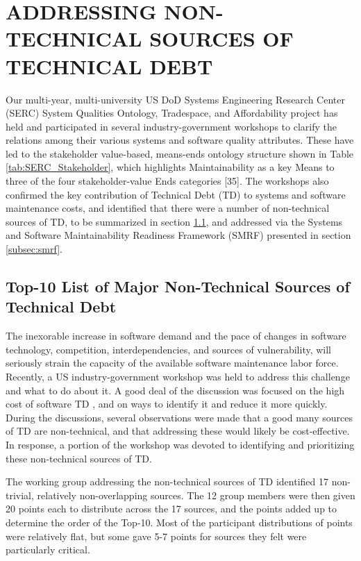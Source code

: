 \section{ADDRESSING NON-TECHNICAL SOURCES OF TECHNICAL DEBT}
\label{sec:smrf}

Our multi-year, multi-university US DoD Systems Engineering Research Center (SERC) System Qualities Ontology, Tradespace, and Affordability project has held and participated in several industry-government workshops to clarify the relations among their various systems and software quality attributes.  These have led to the stakeholder value-based, means-ends ontology structure shown in Table \ref{tab:SERC_Stakeholder}, which highlights Maintainability as a key Means to three of the four stakeholder-value Ends categories [35].
The workshops also confirmed the key contribution of Technical Debt (TD) to systems and software maintenance costs, and identified that there were a number of non-technical sources of TD, to be summarized in section \ref{subsec:topten}, and addressed via the Systems and Software Maintainability Readiness Framework (SMRF) presented in section \ref{subsec:smrf}.


\subsection{Top-10 List of Major Non-Technical Sources of Technical Debt}
\label{subsec:topten}

The inexorable increase in software demand and the pace of changes in software technology, competition, interdependencies, and sources of vulnerability, will seriously strain the capacity of the available software maintenance labor force.
Recently, a US industry-government workshop was held to address this challenge and what to do about it.
A good deal of the discussion was focused on the high cost of software TD \cite{6336722}, and on ways to identify it and reduce it more quickly.
During the discussions, several observations were made that a good many sources of TD are non-technical, and that addressing these would likely be cost-effective.
In response, a portion of the workshop was devoted to identifying and prioritizing these non-technical sources of TD.

The working group addressing the non-technical sources of TD identified 17 non-trivial, relatively non-overlapping sources.
The 12 group members were then given 20 points each to distribute across the 17 sources, and the points added up to determine the order of the Top-10.
Most of the participant distributions of points were relatively flat, but some gave 5-7 points for sources they felt were particularly critical.

